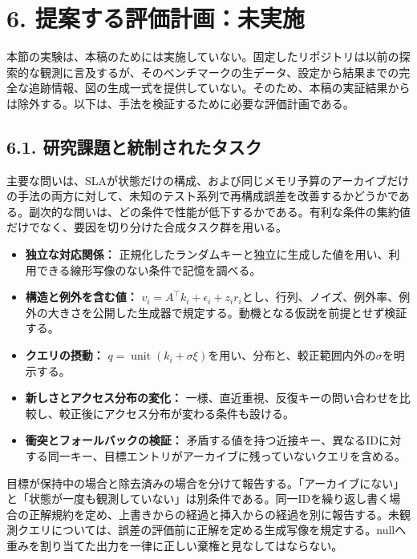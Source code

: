 \documentclass[11pt,a4paper]{article}
\providecommand{\tightlist}{\setlength{\itemsep}{0pt}\setlength{\parskip}{0pt}}
\begin{document}
\section{6. 提案する評価計画：未実施}\label{ux63d0ux6848ux3059ux308bux8a55ux4fa1ux8a08ux753bux672aux5b9fux65bd}

本節の実験は、本稿のためには実施していない。固定したリポジトリは以前の探索的な観測に言及するが、そのベンチマークの生データ、設定から結果までの完全な追跡情報、図の生成一式を提供していない。そのため、本稿の実証結果からは除外する。以下は、手法を検証するために必要な評価計画である。

\subsection{6.1. 研究課題と統制されたタスク}\label{ux7814ux7a76ux8ab2ux984cux3068ux7d71ux5236ux3055ux308cux305fux30bfux30b9ux30af}

主要な問いは、SLAが状態だけの構成、および同じメモリ予算のアーカイブだけの手法の両方に対して、未知のテスト系列で再構成誤差を改善するかどうかである。副次的な問いは、どの条件で性能が低下するかである。有利な条件の集約値だけでなく、要因を切り分けた合成タスク群を用いる。

\begin{itemize}
\tightlist
\item
  \textbf{独立な対応関係：} 正規化したランダムキーと独立に生成した値を用い、利用できる線形写像のない条件で記憶を調べる。
\item
  \textbf{構造と例外を含む値：} \(v_i=A^{\top}k_i+\epsilon_i+z_i r_i\)とし、行列、ノイズ、例外率、例外の大きさを公開した生成器で規定する。動機となる仮説を前提とせず検証する。
\item
  \textbf{クエリの摂動：} \(q=\operatorname{unit}(k_i+\sigma\xi)\)を用い、分布と、較正範囲内外の\(\sigma\)を明示する。
\item
  \textbf{新しさとアクセス分布の変化：} 一様、直近重視、反復キーの問い合わせを比較し、較正後にアクセス分布が変わる条件も設ける。
\item
  \textbf{衝突とフォールバックの検証：} 矛盾する値を持つ近接キー、異なるIDに対する同一キー、目標エントリがアーカイブに残っていないクエリを含める。
\end{itemize}

目標が保持中の場合と除去済みの場合を分けて報告する。「アーカイブにない」と「状態が一度も観測していない」は別条件である。同一IDを繰り返し書く場合の正解規約を定め、上書きからの経過と挿入からの経過を別に報告する。未観測クエリについては、誤差の評価前に正解を定める生成写像を規定する。nullへ重みを割り当てた出力を一律に正しい棄権と見なしてはならない。
\end{document}
